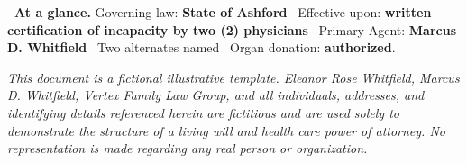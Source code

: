 \vspace{6pt}

\begin{glancebox}
\textbf{\faFile\ At a glance.} Governing law: \textbf{State of Ashford} \textbullet\ Effective upon: \textbf{written certification of incapacity by two (2) physicians} \textbullet\ Primary Agent: \textbf{Marcus D. Whitfield} \textbullet\ Two alternates named \textbullet\ Organ donation: \textbf{authorized}.
\end{glancebox}

\vspace{4pt}
{\scriptsize\color{willslate}\itshape This document is a fictional illustrative template. Eleanor Rose Whitfield, Marcus D. Whitfield, Vertex Family Law Group, and all individuals, addresses, and identifying details referenced herein are fictitious and are used solely to demonstrate the structure of a living will and health care power of attorney. No representation is made regarding any real person or organization.}
